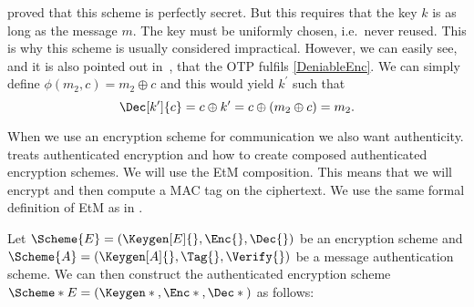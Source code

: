 \citet{ShannonSecrecy} proved that this scheme is perfectly secret.
But this requires that the key \(k\) is as long as the message \(m\).
The key must be uniformly chosen, i.e.~never reused.
This is why this scheme is usually considered impractical.
However, we can easily see, and it is also pointed out 
in~\cite{DeniableEncryption}, that the \ac{OTP} fulfils 
\cref{DeniableEnc}.
We can simply define \(\phi( m_2, c ) = m_2\oplus c\) and this would yield 
\(k^\prime\) such that \[
  \Dec[k^\prime]{ c } = c\oplus k^\prime = c\oplus ( m_2\oplus c ) = m_2.
\]

When we use an encryption scheme for communication we also want authenticity.
\citet{AuthEncryption} treats authenticated encryption and how to create 
composed authenticated encryption schemes.
We will use the \ac{EtM} composition.
This means that we will encrypt and then compute a \ac{MAC} tag on the 
ciphertext.
We use the same formal definition of \ac{EtM} as in 
\cite{AuthEncryption}.

\begin{definition}\label{EtM}
  Let \(\Scheme{E} = (\Keygen[E]{}, \Enc{}, \Dec{})\) be an encryption scheme 
  and \(\Scheme{A} = (\Keygen[A]{}, \Tag{}, \Verify{})\) be a message 
  authentication scheme.
  We can then construct the authenticated encryption scheme \(\Scheme*{E} 
    = (\Keygen*{}, \Enc*{}, \Dec*{})\) as follows:
  \begin{center}
    \normalfont{}
    \begin{minipage}[t]{0.3\textwidth}
      \begin{algorithmic}
        \Function{$\Keygen*{}$}{}
          \State{$\Key{}\rgets \Keygen[E]{}$}
          \State{$\TagKey{}\rgets \Keygen[A]{}$}
          \State{\Return{$\Key{}\concat \TagKey{}$}}
        \EndFunction{}
      \end{algorithmic}
    \end{minipage}%
    \vline%
    \begin{minipage}[t]{0.33\textwidth}
      \begin{algorithmic}
        \EndFunction{}
      \end{algorithmic}
    \end{minipage}%
    \vline%
    \begin{minipage}[t]{0.33\textwidth}
      \begin{algorithmic}
          \EndIf{}
          \State{\Return{$\bot$}}
        \EndFunction{}
      \end{algorithmic}
    \end{minipage}
  \end{center}
\end{definition}

